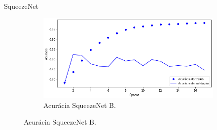 \begin{frame}{SqueezeNet}
\begin{figure}[h!]
\begin{subfigure}{0.3\linewidth}
    \end{subfigure}
    \hspace{1.5cm}
    \begin{subfigure}{0.3\linewidth}
      \caption{Acurácia SqueezeNet B.\label{subfig:squeezenet-b-acc}}
      \includegraphics[width=\linewidth]{img/squeezenet-b-acc}%
    \end{subfigure}
    \label{fig:treinamento-alexnet}
  \end{figure}
\end{frame}

